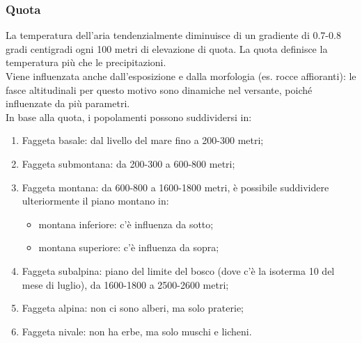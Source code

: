 \subsubsection{Quota}
La temperatura dell'aria tendenzialmente diminuisce di un gradiente di 0.7-0.8 gradi centigradi ogni 100 metri di elevazione di quota. La quota definisce la temperatura più che le precipitazioni.\\
Viene influenzata anche dall'esposizione e dalla morfologia (es. rocce affioranti): le fasce altitudinali per questo motivo sono dinamiche nel versante, poiché influenzate da più parametri.\\
In base alla quota, i popolamenti possono suddividersi in:
\begin{enumerate}[nosep]
    \item Faggeta basale: dal livello del mare fino a 200-300 metri;
    \item Faggeta submontana: da 200-300 a 600-800 metri;
    \item Faggeta montana: da 600-800 a 1600-1800 metri, è possibile suddividere ulteriormente il piano montano in:
    \begin{itemize}[nosep]
        \item montana inferiore: c'è influenza da sotto;
        \item montana superiore: c'è influenza da sopra;
    \end{itemize}
    \item Faggeta subalpina: piano del limite del bosco (dove c'è la isoterma 10 del mese di luglio), da 1600-1800 a 2500-2600 metri;
    \item Faggeta alpina: non ci sono alberi, ma solo praterie;
    \item Faggeta nivale: non ha erbe, ma solo muschi e licheni.
\end{enumerate}
